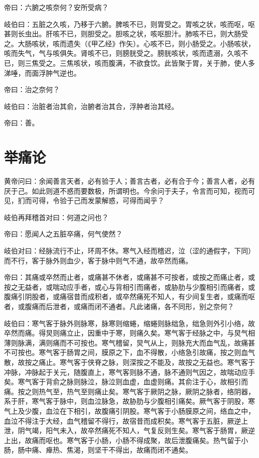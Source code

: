 \documentclass{article}%
\begin{document}
帝曰：六腑之咳奈何？安所受病？

岐伯曰：五脏之久咳，乃移于六腑。脾咳不已，则胃受之。胃咳之状，咳而呕，呕甚则长虫出。肝咳不已，则胆受之。胆咳之状，咳呕胆汁。肺咳不已，则大肠受之。大肠咳状，咳而遗失（《甲乙经》作矢）。心咳不已，则小肠受之。小肠咳状，咳而失气，气与咳俱失。肾咳不已，则膀胱受之。膀胱咳状，咳而遗溺，久咳不已，则三焦受之。三焦咳状，咳而腹满，不欲食饮。此皆聚于胃，关于肺，使人多涕唾，而面浮肿气逆也。

帝曰：治之奈何？

岐伯曰：治脏者治其俞，治腑者治其合，浮肿者治其经。

帝曰：善。


\section{举痛论}
黄帝问曰：余闻善言天者，必有验于人；善言古者，必有合于今；善言人者，必有厌于己。如此则道不惑而要数极，所谓明也。今余问于夫子，令言而可知，视而可见，扪而可得，令验于己而发蒙解惑，可得而闻乎？

岐伯再拜稽首对曰：何道之问也？

帝曰：愿闻人之五脏卒痛，何气使然？

岐伯对曰：经脉流行不止，环周不休。寒气入经而稽迟，泣（涩的通假字，下同）而不行，客于脉外则血少，客于脉中则气不通，故卒然而痛。

帝曰：其痛或卒然而止者，或痛甚不休者，或痛甚不可按者，或按之而痛止者，或按之无益者，或喘动应手者，或心与背相引而痛者，或胁肋与少腹相引而痛者，或腹痛引阴股者，或痛宿昔而成积者，或卒然痛死不知人，有少间复生者，或痛而呕者，或腹痛而后泄者，或痛而闭不通者。凡此诸痛，各不同形，别之奈何？

岐伯曰：寒气客于脉外则脉寒，脉寒则缩蜷，缩蜷则脉绌急，绌急则外引小络，故卒然而痛。得炅则痛立止，因重中于寒，则痛久矣。寒气客于经脉之中，与炅气相薄则脉满，满则痛而不可按也。寒气稽留，炅气从上，则脉充大而血气乱，故痛甚不可按也。寒气客于肠胃之间，膜原之下，血不得散，小络急引故痛，按之则血气散，故按之痛止。寒气客于侠脊之脉，则深按之不能及，故按之无益也。寒气客于冲脉，冲脉起于关元，随腹直上，寒气客则脉不通，脉不通则气因之，故喘动应手矣。寒气客于背俞之脉则脉泣，脉泣则血虚，血虚则痛。其俞注于心，故相引而痛。按之则热气至，热气至则痛止矣。寒气客于厥阴之脉，厥阴之脉者，络阴器，系于肝，寒气客于脉中，则血泣脉急，故胁肋与少腹相引痛矣。厥气客于阴股，寒气上及少腹，血泣在下相引，故腹痛引阴股。寒气客于小肠膜原之间，络血之中，血泣不得注于大经，血气稽留不得行，故宿昔而成积矣。寒气客于五脏，厥逆上泄，阴气竭，阳气未入，故卒然痛死不知人，气复反则生矣。寒气客于肠胃，厥逆上出，故痛而呕也。寒气客于小肠，小肠不得成聚，故后泄腹痛矣。热气留于小肠，肠中痛、瘅热、焦渴，则坚干不得出，故痛而闭不通矣。
\end{document}
